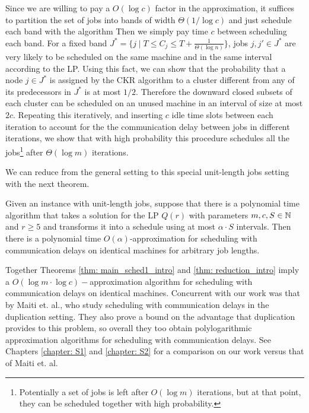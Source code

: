 Since we are willing to pay a $O(\log c)$ factor in the approximation, 
it suffices to partition the set of jobs into bands of width $\Theta(1/\log c)$ and just schedule each band with the algorithm
Then we simply pay time $c$ between scheduling each band.
For a fixed band $J^* = \{j \mid T \leq C_j \leq T + \frac{1}{\Theta( \log n)}\}$, jobs $j,j' \in J^*$ are very likely to be scheduled on the same machine and in the 
same interval according to the LP. Using this fact, we can show that 
 the probability that a node $j \in J^*$ is assigned by the CKR algorithm to a cluster different from any of its predecessors in $J^*$ is at most $1/2$.   
Therefore the downward closed subsets of each cluster can be scheduled on an unused machine in an interval of size at most $2c$.
Repeating this iteratively, and inserting $c$ idle time slots between each iteration to account for the the communication delay between jobs in different iterations,
we show that with high probability this procedure schedules all the jobs\footnote{Potentially a set of jobs is left after $O(\log m)$ iterations, 
but at that point, they can be scheduled together with high probability.} after $\Theta(\log m)$ iterations. 



We can reduce from the general setting to this special unit-length jobs setting with the next theorem.
\begin{theorem}\label{thm: reduction_intro}
  Given an instance with unit-length jobs, 
  suppose that there is a polynomial time algorithm that takes a solution for the LP $Q(r)$ with parameters $m,c,S \in \mathbb{N}$ and $r \geq 5$
  and transforms it into a schedule using at most $\alpha \cdot S$
  intervals. Then there is a polynomial time  $O(\alpha)$-approximation for scheduling with communication delays on identical machines for arbitrary job lengths.
\end{theorem}
Together Theorems \ref{thm: main_sched1_intro} and \ref{thm: reduction_intro} imply a $O(\log m \cdot \log c)-$approximation algorithm for scheduling with communication delays on identical machines.
Concurrent with our work was that by Maiti et. al., who study scheduling with communication delays in the duplication setting. 
They also prove a bound on the advantage that duplication provides to this problem, so overall they too obtain polylogarithmic approximation algorithms for scheduling with communication delays.
See Chapters \ref{chapter: S1} and \ref{chapter: S2} for a comparison on our work versus that of Maiti et. al.

